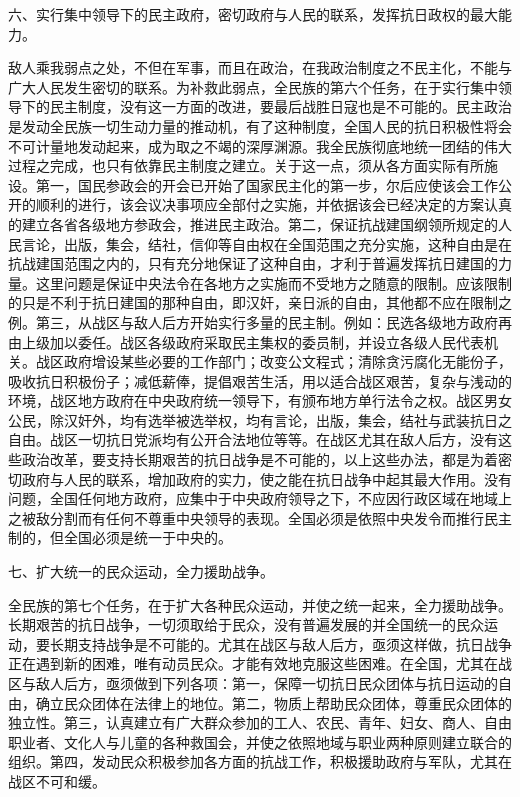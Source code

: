 六、实行集中领导下的民主政府，密切政府与人民的联系，发挥抗日政权的最大能力。

敌人乘我弱点之处，不但在军事，而且在政治，在我政治制度之不民主化，不能与广大人民发生密切的联系。为补救此弱点，全民族的第六个任务，在于实行集中领导下的民主制度，没有这一方面的改进，要最后战胜日寇也是不可能的。民主政治是发动全民族一切生动力量的推动机，有了这种制度，全国人民的抗日积极性将会不可计量地发动起来，成为取之不竭的深厚渊源。我全民族彻底地统一团结的伟大过程之完成，也只有依靠民主制度之建立。关于这一点，须从各方面实际有所施设。第一，国民参政会的开会已开始了国家民主化的第一步，尔后应使该会工作公开的顺利的进行，该会议决事项应全部付之实施，并依据该会已经决定的方案认真的建立各省各级地方参政会，推进民主政治。第二，保证抗战建国纲领所规定的人民言论，出版，集会，结社，信仰等自由权在全国范围之充分实施，这种自由是在抗战建国范围之内的，只有充分地保证了这种自由，才利于普遍发挥抗日建国的力量。这里问题是保证中央法令在各地方之实施而不受地方之随意的限制。应该限制的只是不利于抗日建国的那种自由，即汉奸，亲日派的自由，其他都不应在限制之例。第三，从战区与敌人后方开始实行多量的民主制。例如：民选各级地方政府再由上级加以委任。战区各级政府采取民主集权的委员制，并设立各级人民代表机关。战区政府增设某些必要的工作部门；改变公文程式；清除贪污腐化无能份子，吸收抗日积极份子；减低薪俸，提倡艰苦生活，用以适合战区艰苦，复杂与浅动的环境，战区地方政府在中央政府统一领导下，有颁布地方单行法令之权。战区男女公民，除汉奸外，均有选举被选举权，均有言论，出版，集会，结社与武装抗日之自由。战区一切抗日党派均有公开合法地位等等。在战区尤其在敌人后方，没有这些政治改革，要支持长期艰苦的抗日战争是不可能的，以上这些办法，都是为着密切政府与人民的联系，增加政府的实力，使之能在抗日战争中起其最大作用。没有问题，全国任何地方政府，应集中于中央政府领导之下，不应因行政区域在地域上之被敌分割而有任何不尊重中央领导的表现。全国必须是依照中央发令而推行民主制的，但全国必须是统一于中央的。

七、扩大统一的民众运动，全力援助战争。

全民族的第七个任务，在于扩大各种民众运动，并使之统一起来，全力援助战争。长期艰苦的抗日战争，一切须取给于民众，没有普遍发展的并全国统一的民众运动，要长期支持战争是不可能的。尤其在战区与敌人后方，亟须这样做，抗日战争正在遇到新的困难，唯有动员民众。才能有效地克服这些困难。在全国，尤其在战区与敌人后方，亟须做到下列各项：第一，保障一切抗日民众团体与抗日运动的自由，确立民众团体在法律上的地位。第二，物质上帮助民众团体，尊重民众团体的独立性。第三，认真建立有广大群众参加的工人、农民、青年、妇女、商人、自由职业者、文化人与儿童的各种救国会，并使之依照地域与职业两种原则建立联合的组织。第四，发动民众积极参加各方面的抗战工作，积极援助政府与军队，尤其在战区不可和缓。

